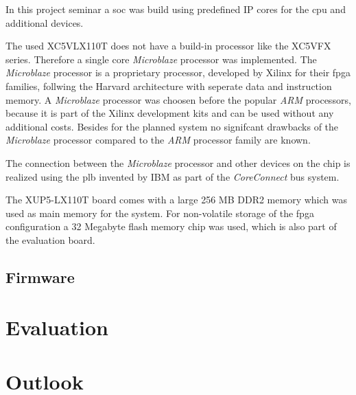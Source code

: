 In this project seminar a \gls{soc} was build using predefined IP cores for the cpu and additional devices.

The used XC5VLX110T does not have a build-in processor like the XC5VFX series. Therefore a single core \textit{Microblaze} processor was implemented. The \textit{Microblaze} processor is a proprietary processor, developed by Xilinx for their \gls{fpga} families, follwing the Harvard architecture with seperate data and instruction memory. A \textit{Microblaze} processor was choosen before the popular \textit{ARM} processors, because it is part of the Xilinx development kits and can be used without any additional costs. Besides for the planned system no signifcant drawbacks of the \textit{Microblaze} processor compared to the \textit{ARM} processor family are known.

The connection between the \textit{Microblaze} processor and other devices on the chip is realized using the \gls{plb} invented by IBM as part of the \textit{CoreConnect} bus system.

The XUP5-LX110T board comes with a large 256 MB DDR2 memory which was used as main memory for the system. For non-volatile storage of the \gls{fpga} configuration a 32 Megabyte flash memory chip was used, which is also part of the evaluation board.

\section{Firmware}



\chapter{Evaluation}

\chapter{Outlook}